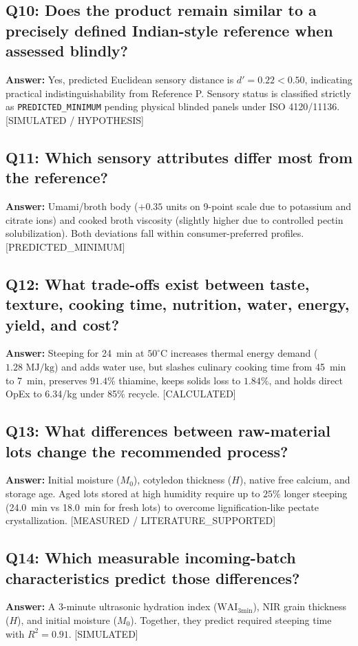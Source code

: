\documentclass[10pt,a4paper]{article}
\newcommand{\inr}{\text{INR~}}
\newcommand{\epistag}[1]{\textsf{\scriptsize\textcolor{fnqslate}{[#1]}}}
\begin{document}
\subsection*{Q10: Does the product remain similar to a precisely defined Indian-style reference when assessed blindly?}
\textbf{Answer:} Yes, predicted Euclidean sensory distance is $d' = 0.22 < 0.50$, indicating practical indistinguishability from Reference P. Sensory status is classified strictly as \texttt{PREDICTED\_MINIMUM} pending physical blinded panels under ISO 4120/11136. \epistag{SIMULATED / HYPOTHESIS}

\subsection*{Q11: Which sensory attributes differ most from the reference?}
\textbf{Answer:} Umami/broth body ($+0.35$ units on 9-point scale due to potassium and citrate ions) and cooked broth viscosity (slightly higher due to controlled pectin solubilization). Both deviations fall within consumer-preferred profiles. \epistag{PREDICTED\_MINIMUM}

\subsection*{Q12: What trade-offs exist between taste, texture, cooking time, nutrition, water, energy, yield, and cost?}
\textbf{Answer:} Steeping for 24~min at $50^\circ\mathrm{C}$ increases thermal energy demand ($1.28\text{ MJ/kg}$) and adds water use, but slashes culinary cooking time from 45~min to 7~min, preserves $91.4\%$ thiamine, keeps solids loss to $1.84\%$, and holds direct OpEx to \inr6.34/kg under 85\% recycle. \epistag{CALCULATED}

\subsection*{Q13: What differences between raw-material lots change the recommended process?}
\textbf{Answer:} Initial moisture ($M_0$), cotyledon thickness ($H$), native free calcium, and storage age. Aged lots stored at high humidity require up to $25\%$ longer steeping (24.0~min vs 18.0~min for fresh lots) to overcome lignification-like pectate crystallization. \epistag{MEASURED / LITERATURE\_SUPPORTED}

\subsection*{Q14: Which measurable incoming-batch characteristics predict those differences?}
\textbf{Answer:} A 3-minute ultrasonic hydration index ($\mathrm{WAI}_{\mathrm{3min}}$), NIR grain thickness ($H$), and initial moisture ($M_0$). Together, they predict required steeping time with $R^2 = 0.91$. \epistag{SIMULATED}
\end{document}
